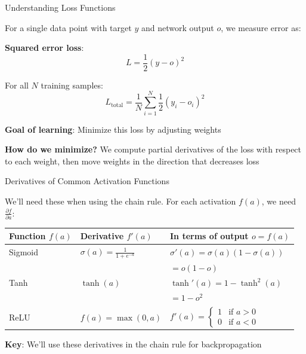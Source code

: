 \documentclass[aspectratio=169]{beamer}\usepackage[]{graphicx}\usepackage[]{xcolor}
\begin{document}
\begin{frame}{Understanding Loss Functions}

For a single data point with target $y$ and network output $o$, we measure error as:

\vfill

\textbf{Squared error loss}:
\[
L = \frac{1}{2}(y - o)^2
\]

\vfill

For all $N$ training samples:
\[
L_{\text{total}} = \frac{1}{N} \sum_{i=1}^{N} \frac{1}{2}(y_i - o_i)^2
\]

\vfill

\textbf{Goal of learning}: Minimize this loss by adjusting weights

\vfill

\textbf{How do we minimize?} We compute partial derivatives of the loss with respect to each weight, then move weights in the direction that decreases loss

\end{frame}

\begin{frame}{Derivatives of Common Activation Functions}

We'll need these when using the chain rule. For each activation $f(a)$, we need $\frac{\partial f}{\partial a}$:

\vfill

\begin{center}
\small
\begin{tabular}{lll}
\toprule
\textbf{Function} $f(a)$ & \textbf{Derivative} $f'(a)$ & \textbf{In terms of output } $o = f(a)$ \\
\midrule
Sigmoid & $\sigma(a) = \frac{1}{1+e^{-a}}$ & $\sigma'(a) = \sigma(a)(1-\sigma(a))$ \\
& & $= o(1-o)$ \\
\midrule
Tanh & $\tanh(a)$ & $\tanh'(a) = 1 - \tanh^2(a)$ \\
& & $= 1 - o^2$ \\
\midrule
ReLU & $f(a) = \max(0, a)$ & $f'(a) = \begin{cases} 1 & \text{if } a > 0 \\ 0 & \text{if } a < 0 \end{cases}$ \\
\bottomrule
\end{tabular}
\end{center}

\vfill

\textbf{Key}: We'll use these derivatives in the chain rule for backpropagation
\end{frame}
\end{document}
